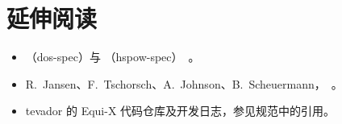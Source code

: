 \section*{延伸阅读}
\begin{itemize}
  \item {}（dos-spec）与 （hspow-spec）~\cite{torspec}。
  \item R.~Jansen、F.~Tschorsch、A.~Johnson、B.~Scheuermann，~\cite{jansen2014sniper}。
  \item tevador 的 Equi-X 代码仓库及开发日志，参见规范中的引用。
\end{itemize}

